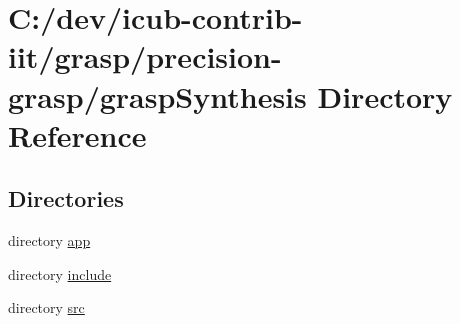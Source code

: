 \section{C\+:/dev/icub-\/contrib-\/iit/grasp/precision-\/grasp/grasp\+Synthesis Directory Reference}
\label{dir_6ea4152d040292e3f8e7b7a946b5e9bb}
\subsection*{Directories}
\begin{DoxyCompactItemize}
\item 
directory \hyperlink{dir_707e51a282040400ef43d31232de42d6}{app}
\item 
directory \hyperlink{dir_2904cfe4adca6faf893553385f822bf5}{include}
\item 
directory \hyperlink{dir_eec1d89e5185f11aea105d7bee0bc98d}{src}
\end{DoxyCompactItemize}
